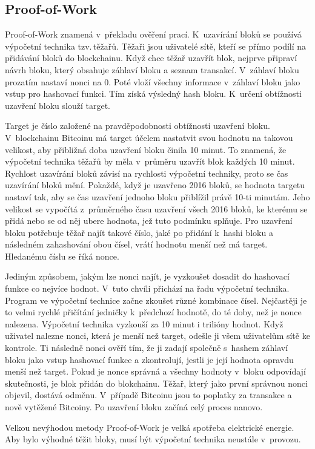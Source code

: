 \documentclass[12pt]{report}			%
\begin{document}
		\subsection{Proof-of-Work}{
Proof-of-Work znamená v~překladu ověření prací. K~uzavírání bloků se používá výpočetní technika tzv.\,těžařů. Těžaři jsou uživatelé sítě, kteří se přímo podílí na přidávání bloků do blockchainu. Když chce těžař uzavřít blok, nejprve připraví návrh bloku, který obsahuje záhlaví bloku a seznam transakcí. V~záhlaví bloku prozatím nastaví nonci na 0. Poté vloží všechny informace v~záhlaví bloku jako vstup pro hashovací funkci. Tím získá výsledný hash bloku. K~určení obtížnosti uzavření bloku slouží target. \cite{Antonopoulos2017}

Target je číslo založené na pravděpodobnosti obtížnosti uzavření bloku. V~blockchainu Bitcoinu má target účelem nastatvit svou hodnotu na takovou velikost, aby přibližná doba uzavření bloku činila 10 minut. To znamená, že výpočetní technika těžařů by měla v~průměru uzavřít blok každých 10 minut. Rychlost uzavírání bloků závisí na rychlosti výpočetní techniky, proto se čas uzavírání bloků mění. Pokaždé, když je uzavřeno 2016 bloků, se hodnota targetu nastaví tak, aby se čas uzavření jednoho bloku přiblížil právě 10-ti minutám. Jeho velikost se vypočítá z~průměrného času uzavření všech 2016 bloků, ke kterému se přidá nebo se od něj ubere hodnota, jež tuto podmínku splňuje. Pro uzavření bloku potřebuje těžař najít takové číslo, jaké po přidání k~hashi bloku a následném zahashování obou čísel, vrátí hodnotu menší než má target. Hledanému číslu se říká nonce. \cite{Antonopoulos2017}

Jediným způsobem, jakým lze nonci najít, je vyzkoušet dosadit do hashovací funkce co nejvíce hodnot. V~tuto chvíli přichází na řadu výpočetní technika. Program ve výpočetní technice začne zkoušet různé kombinace čísel. Nejčastěji je to velmi rychlé přičítání jedničky k~předchozí hodnotě, do té doby, než je nonce nalezena. Výpočetní technika vyzkouší za 10 minut i trilióny hodnot. Když uživatel nalezne nonci, která je menší než target, odešle ji všem uživatelům sítě ke kontrole. Ti následně nonci ověří tím, že ji zadají společně s~hashem záhlaví bloku jako vstup hashovací funkce a zkontrolují, jestli je její hodnota opravdu menší než target. Pokud je nonce správná a všechny hodnoty v~bloku odpovídají skutečnosti, je blok přidán do blokchainu. Těžař, který jako první správnou nonci objevil, dostává odměnu. V~případě Bitcoinu jsou to poplatky za transakce a nově vytěžené Bitcoiny. Po uzavření bloku začíná celý proces nanovo. \cite{Antonopoulos2017}

Velkou nevýhodou metody Proof-of-Work je velká spotřeba elektrické energie. Aby bylo výhodné těžit bloky, musí být výpočetní technika neustále v~provozu. \cite{Weston2021}
		}
\end{document}
